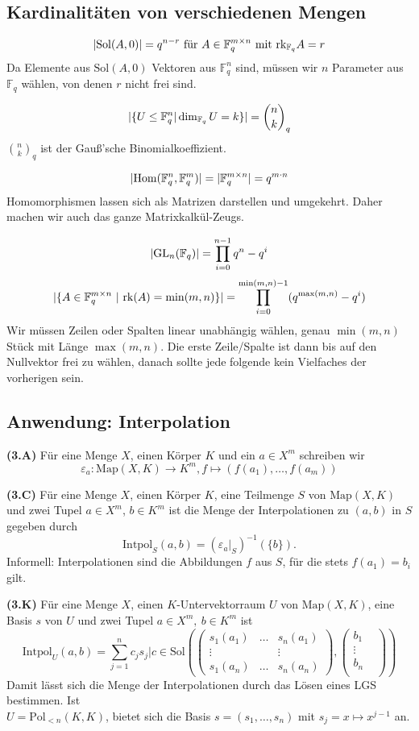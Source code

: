 \documentclass[a4paper,parskip=half*,DIV=15,fontsize=11pt]{scrartcl}
\newlength{\hangwidth}
\newcommand{\skript}[1]{\settowidth{\hangwidth}{\textbf{(#1)} }\hangpara{\hangwidth}{1}\textbf{(#1)} \ignorespaces} %
\newcommand{\Sol}{\mathrm{Sol}} %
\newcommand{\rk}{\mathrm{rk}} %
\newcommand{\GL}{\mathrm{GL}} %
\newcommand{\Map}{\mathrm{Map}} %
\newcommand{\Pol}{\mathrm{Pol}} %
\newcommand{\Field}{\mathbb{F}} %
\newcommand{\Intpol}{\mathrm{Intpol}}
\DeclarePairedDelimiter\abs{\lvert}{\rvert} %
\begin{document}
\subsection{Kardinalitäten von verschiedenen Mengen}

$$\abs{\Sol(A,0)} = q^{n-r} \text{ für } A \in \Field_q^{m \times n} \text{ mit } \rk_{\Field_q} A = r$$
Da Elemente aus $\Sol(A,0)$ Vektoren aus $\Field_q^n$ sind, müssen wir $n$ Parameter aus $\Field_q$ wählen, von denen $r$ nicht frei sind.

$$\abs{\{ U \leq \Field_q^n | \dim_{\Field_q} U = k \}} = \binom{n}{k}_q$$
$\binom{n}{k}_q$ ist der Gauß'sche Binomialkoeffizient.

$$\abs{\mathrm{Hom}(\Field_q^n,\Field_q^m)} = \abs{\Field_q^{m \times n}} = q^{m \cdot n}$$
Homomorphismen lassen sich als Matrizen darstellen und umgekehrt. Daher machen wir auch das ganze Matrixkalkül-Zeugs.

$$\abs{\GL_n(\Field_q)} = \prod_{i=0}^{n-1} q^n-q^i$$
$$\abs{\{A \in \Field_q^{m \times n} ~ | ~ \rk(A) = \min(m,n)\}} = \prod_{i=0}^{\min(m,n)-1} (q^{\max(m,n)}-q^i)$$
Wir müssen Zeilen oder Spalten linear unabhängig wählen, genau $\min(m,n)$ Stück mit Länge $\max(m,n)$. Die erste Zeile/Spalte ist dann bis auf den Nullvektor frei zu wählen, danach sollte jede folgende kein Vielfaches der vorherigen sein.

\subsection{Anwendung: Interpolation}
\skript{3.A} Für eine Menge $X$, einen Körper $K$ und ein $a \in X^m$ schreiben wir
$$\varepsilon_a:\Map(X,K) \to K^m, f \mapsto (f(a_1),\dots,f(a_m))$$

\skript{3.C} Für eine Menge $X$, einen Körper $K$, eine Teilmenge $S$ von $\Map(X,K)$ und zwei Tupel $a \in X^m$, $b\in K^m$ ist die Menge der Interpolationen zu $(a,b)$ in $S$ gegeben durch
$$\Intpol_S(a,b)=(\varepsilon_a|_S)^{-1}(\{b\}).$$
Informell: Interpolationen sind die Abbildungen $f$ aus $S$, für die stets $f(a_1)=b_i$ gilt.

\skript{3.K} Für eine Menge $X$, einen $K$-Untervektorraum $U$ von $\Map(X,K)$, eine Basis $s$ von $U$ und zwei Tupel $a \in X^m,\ b \in K^m$ ist
$$\Intpol_U(a,b)={\sum_{j=1}^{n}c_j s_j | c \in \Sol(
	\left(\begin{array}{ccc}
	s_1(a_1)& \dots & s_n(a_1)	\\
	\vdots & &  \vdots	\\
	s_1(a_n) & \dots & s_n(a_n)
	\end{array}\right),
	\left(\begin{array}{cc}
	b_1 &\\
	\vdots &\\
	b_n &\\
	\end{array}\right)
	)}$$
Damit lässt sich die Menge der Interpolationen durch das Lösen eines LGS bestimmen. Ist\\ $U = \Pol_{<n}(K,K)$, bietet sich die Basis $s=(s_1,\dots,s_n)$ mit $s_j= x \mapsto x^{j-1}$ an.
\end{document}
